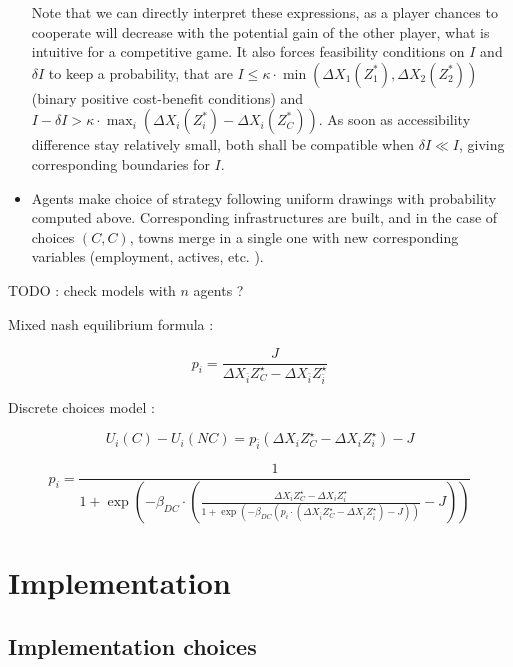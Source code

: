 \begin{itemize}
Note that we can directly interpret these expressions, as a player chances to cooperate will decrease with the potential gain of the other player, what is intuitive for a competitive game. It also forces feasibility conditions on $I$ and $\delta I$ to keep a probability, that are $I \leq \kappa\cdot \min(\Delta X_1(Z^{\ast}_1),\Delta X_2(Z^{\ast}_2))$ (binary positive cost-benefit conditions) and $I-\delta I > \kappa \cdot \max_i (\Delta X_i(Z^{\ast}_i)-\Delta X_i(Z^{\ast}_C))$. As soon as accessibility difference stay relatively small, both shall be compatible when $\delta I \ll I$, giving corresponding boundaries for $I$.

\item Agents make choice of strategy following uniform drawings with probability computed above. Corresponding infrastructures are built, and in the case of choices $(C,C)$, towns merge in a single one with new corresponding variables (employment, actives, etc. ).


\end{itemize}











TODO : check models with $n$ agents ?

Mixed nash equilibrium formula : 

\[
p_i = \frac{J}{\Delta X_{\bar{i}}{Z^{\star}_{C}} - \Delta X_{\bar{i}}{Z^{\star}_{\bar{i}}}}
\]


Discrete choices model :

\[
U_i(C) - U_i(NC) = p_{\bar{i}} \left( \Delta X_{i}{Z^{\star}_{C}} - \Delta X_{i}{Z^{\star}_{i}}\right) - J
\]

\[
p_i = \frac{1}{1 + \exp{\left(-\beta_{DC}\cdot \left(\frac{\Delta X_{i}{Z^{\star}_{C}} - \Delta X_{i}{Z^{\star}_{i}}}{1 + \exp{\left(- \beta_{DC}(p_i \cdot (\Delta X_{\bar{i}}{Z^{\star}_{C}} - \Delta X_{\bar{i}}{Z^{\star}_{\bar{i}}}) - J)\right)}} - J \right)\right)}}
\]





\section{Implementation}



\subsection{Implementation choices}

